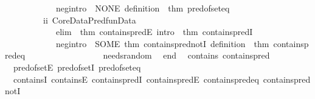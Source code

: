 \begin{isabellebody}
\ \ \ \ \ \ \ \ \ \ \ \ neg{\isacharunderscore}{\kern0pt}intro\ {\isacharequal}{\kern0pt}\ NONE{\isacharcomma}{\kern0pt}\ definition\ {\isacharequal}{\kern0pt}\ {\isacharat}{\kern0pt}{\isacharbraceleft}{\kern0pt}thm\ pred{\isacharunderscore}{\kern0pt}of{\isacharunderscore}{\kern0pt}set{\isacharunderscore}{\kern0pt}eq{\isacharbraceright}{\kern0pt}\isanewline
\ \ \ \ \ \ \ \ \ \ {\isacharbraceright}{\kern0pt}{\isacharparenright}{\kern0pt}{\isacharcomma}{\kern0pt}\isanewline
\ \ \ \ \ \ \ \ \ {\isacharparenleft}{\kern0pt}ii{\isacharcomma}{\kern0pt}\ Core{\isacharunderscore}{\kern0pt}Data{\isachardot}{\kern0pt}PredfunData\ {\isacharbraceleft}{\kern0pt}\isanewline
\ \ \ \ \ \ \ \ \ \ \ \ elim\ {\isacharequal}{\kern0pt}\ {\isacharat}{\kern0pt}{\isacharbraceleft}{\kern0pt}thm\ contains{\isacharunderscore}{\kern0pt}predE{\isacharbraceright}{\kern0pt}{\isacharcomma}{\kern0pt}\ intro\ {\isacharequal}{\kern0pt}\ {\isacharat}{\kern0pt}{\isacharbraceleft}{\kern0pt}thm\ contains{\isacharunderscore}{\kern0pt}predI{\isacharbraceright}{\kern0pt}{\isacharcomma}{\kern0pt}\ \isanewline
\ \ \ \ \ \ \ \ \ \ \ \ neg{\isacharunderscore}{\kern0pt}intro\ {\isacharequal}{\kern0pt}\ SOME\ {\isacharat}{\kern0pt}{\isacharbraceleft}{\kern0pt}thm\ contains{\isacharunderscore}{\kern0pt}pred{\isacharunderscore}{\kern0pt}notI{\isacharbraceright}{\kern0pt}{\isacharcomma}{\kern0pt}\ definition\ {\isacharequal}{\kern0pt}\ {\isacharat}{\kern0pt}{\isacharbraceleft}{\kern0pt}thm\ contains{\isacharunderscore}{\kern0pt}pred{\isacharunderscore}{\kern0pt}eq{\isacharbraceright}{\kern0pt}\isanewline
\ \ \ \ \ \ \ \ \ \ {\isacharbraceright}{\kern0pt}{\isacharparenright}{\kern0pt}{\isacharbrackright}{\kern0pt}{\isacharcomma}{\kern0pt}\isanewline
\ \ \ \ \ \ \ needs{\isacharunderscore}{\kern0pt}random\ {\isacharequal}{\kern0pt}\ {\isacharbrackleft}{\kern0pt}{\isacharbrackright}{\kern0pt}{\isacharbraceright}{\kern0pt}{\isacharparenright}{\kern0pt}{\isacharparenright}{\kern0pt}\isanewline
end\isanewline
{\isacartoucheclose}%
\endisatagML
{\isafoldML}%
%
\isadelimML
\isanewline
%
\endisadelimML
\isanewline
{}\isamarkupfalse%
\ {\isacharparenleft}{\kern0pt}\ contains\ contains{\isacharunderscore}{\kern0pt}pred\isanewline
{}\isamarkupfalse%
\ {\isacharparenleft}{\kern0pt}\ pred{\isacharunderscore}{\kern0pt}of{\isacharunderscore}{\kern0pt}setE\ pred{\isacharunderscore}{\kern0pt}of{\isacharunderscore}{\kern0pt}setI\ pred{\isacharunderscore}{\kern0pt}of{\isacharunderscore}{\kern0pt}set{\isacharunderscore}{\kern0pt}eq\ \isanewline
\ \ containsI\ containsE\ contains{\isacharunderscore}{\kern0pt}predI\ contains{\isacharunderscore}{\kern0pt}predE\ contains{\isacharunderscore}{\kern0pt}pred{\isacharunderscore}{\kern0pt}eq\ contains{\isacharunderscore}{\kern0pt}pred{\isacharunderscore}{\kern0pt}notI\isanewline
%
\isadelimtheory
\isanewline
%
\endisadelimtheory
%
\isatagtheory
{}\isamarkupfalse%
%
\endisatagtheory
{\isafoldtheory}%
%
\isadelimtheory
%
\endisadelimtheory
%
\end{isabellebody}%
